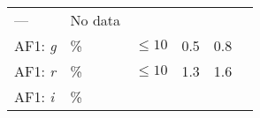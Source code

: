 \documentclass[DM, lsstdraft, toc]{lsstdoc}
\begin{document}
\begin{longtable}[]{@{}llllll@{}}
\begin{minipage}[t]{0.12\columnwidth}
---\strut
\end{minipage} & \begin{minipage}[t]{0.17\columnwidth}\raggedright\strut
No data\strut
\end{minipage}\tabularnewline
\begin{minipage}[t]{0.12\columnwidth}\raggedright\strut
AF1: \emph{g}\strut
\end{minipage} & \begin{minipage}[t]{0.06\columnwidth}\raggedright\strut
\%\strut
\end{minipage} & \begin{minipage}[t]{0.14\columnwidth}\raggedright\strut
\(\leq 10\)\strut
\end{minipage} & \begin{minipage}[t]{0.12\columnwidth}\raggedright\strut
0.5\strut
\end{minipage} & \begin{minipage}[t]{0.12\columnwidth}\raggedright\strut
0.8\strut
\end{minipage} & \begin{minipage}[t]{0.17\columnwidth}\raggedright\strut
\strut
\end{minipage}\tabularnewline
\begin{minipage}[t]{0.12\columnwidth}\raggedright\strut
AF1: \emph{r}\strut
\end{minipage} & \begin{minipage}[t]{0.06\columnwidth}\raggedright\strut
\%\strut
\end{minipage} & \begin{minipage}[t]{0.14\columnwidth}\raggedright\strut
\(\leq 10\)\strut
\end{minipage} & \begin{minipage}[t]{0.12\columnwidth}\raggedright\strut
1.3\strut
\end{minipage} & \begin{minipage}[t]{0.12\columnwidth}\raggedright\strut
1.6\strut
\end{minipage} & \begin{minipage}[t]{0.17\columnwidth}\raggedright\strut
\strut
\end{minipage}\tabularnewline
\begin{minipage}[t]{0.12\columnwidth}\raggedright\strut
AF1: \emph{i}\strut
\end{minipage} & \begin{minipage}[t]{0.06\columnwidth}\raggedright\strut
\%\strut
\end{minipage} & \begin{minipage}[t]{0.14\columnwidth}\raggedright\strut

\end{minipage}
\end{longtable}
\end{document}
